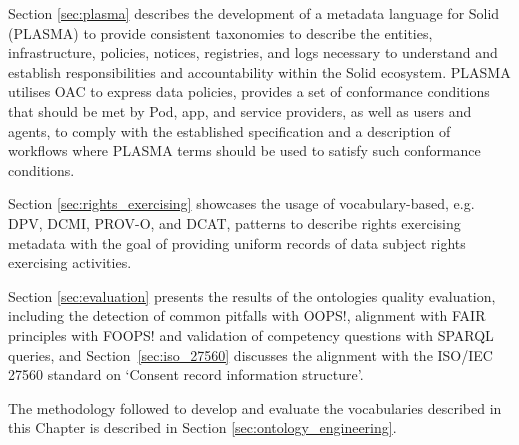 Section \ref{sec:plasma} describes the development of a metadata language for Solid (PLASMA) to provide consistent taxonomies to describe the entities, infrastructure, policies, notices, registries, and logs necessary to understand and establish responsibilities and accountability within the Solid ecosystem.
PLASMA utilises OAC to express data policies, provides a set of conformance conditions that should be met by Pod, app, and service providers, as well as users and agents, to comply with the established specification and a description of workflows where PLASMA terms should be used to satisfy such conformance conditions.

Section \ref{sec:rights_exercising} showcases the usage of vocabulary-based, e.g. DPV, DCMI, PROV-O, and DCAT, patterns to describe rights exercising metadata with the goal of providing uniform records of data subject rights exercising activities.

Section \ref{sec:evaluation} presents the results of the ontologies quality evaluation, including the detection of common pitfalls with OOPS!, alignment with FAIR principles with FOOPS! and validation of competency questions with SPARQL queries, and Section~\ref{sec:iso_27560} discusses the alignment with the ISO/IEC 27560 standard on `Consent record information structure'.

The methodology followed to develop and evaluate the vocabularies described in this Chapter is described in Section \ref{sec:ontology_engineering}.






